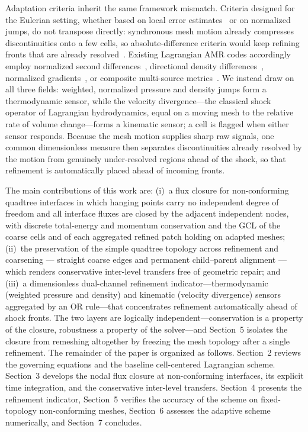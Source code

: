 \documentclass[a4paper]{cas-sc}
\begin{document}
Adaptation criteria inherit the same framework mismatch. Criteria designed for the Eulerian setting, whether based on local error estimates~\cite{berger1984adaptive,lohner1987adaptive} or on normalized jumps, do not transpose directly: synchronous mesh motion already compresses discontinuities onto a few cells, so absolute-difference criteria would keep refining fronts that are already resolved~\cite{colaitis2026cell}. Existing Lagrangian AMR codes accordingly employ normalized second differences~\cite{anderson2004arbitrary}, directional density differences~\cite{morrell2007cell}, normalized gradients~\cite{waltz2018coupled}, or composite multi-source metrics~\cite{colaitis2026cell}. We instead draw on all three fields: weighted, normalized pressure and density jumps form a thermodynamic sensor, while the velocity divergence---the classical shock operator of Lagrangian hydrodynamics, equal on a moving mesh to the relative rate of volume change---forms a kinematic sensor; a cell is flagged when either sensor responds. Because the mesh motion supplies sharp raw signals, one common dimensionless measure then separates discontinuities already resolved by the motion from genuinely under-resolved regions ahead of the shock, so that refinement is automatically placed ahead of incoming fronts.

The main contributions of this work are: (i)~a flux closure for non-conforming quadtree interfaces in which hanging points carry no independent degree of freedom and all interface fluxes are closed by the adjacent independent nodes, with discrete total-energy and momentum conservation and the GCL of the coarse cells and of each aggregated refined patch holding on adapted meshes; (ii)~the preservation of the simple quadtree topology across refinement and coarsening --- straight coarse edges and permanent child--parent alignment --- which renders conservative inter-level transfers free of geometric repair; and (iii)~a dimensionless dual-channel refinement indicator---thermodynamic (weighted pressure and density) and kinematic (velocity divergence) sensors aggregated by an OR rule---that concentrates refinement automatically ahead of shock fronts. The two layers are logically independent---conservation is a property of the closure, robustness a property of the solver---and Section~5 isolates the closure from remeshing altogether by freezing the mesh topology after a single refinement. The remainder of the paper is organized as follows. Section~2 reviews the governing equations and the baseline cell-centered Lagrangian scheme. Section~3 develops the nodal flux closure at non-conforming interfaces, its explicit time integration, and the conservative inter-level transfers. Section~4 presents the refinement indicator, Section~5 verifies the accuracy of the scheme on fixed-topology non-conforming meshes, Section~6 assesses the adaptive scheme numerically, and Section~7 concludes.
\end{document}
